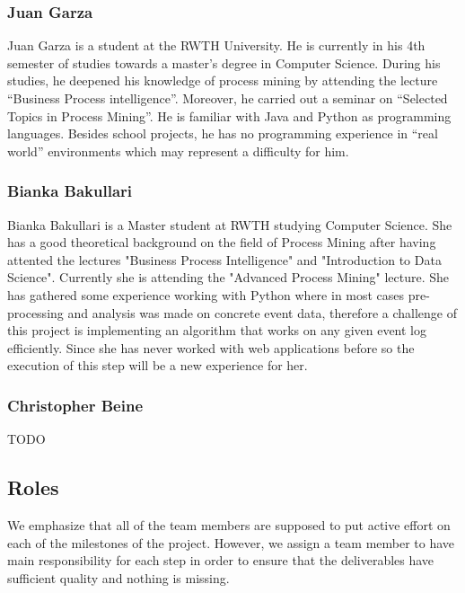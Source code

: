 \documentclass[notitlepage]{article}
\begin{document}
\begin{flushleft}
\subsubsection*{Juan Garza}

Juan Garza is a student at the RWTH University. He is currently in his 4th semester of studies towards a master’s degree in Computer Science. During his studies, he deepened his knowledge of process mining by attending the lecture “Business Process intelligence”. Moreover, he carried out a seminar on “Selected Topics in Process Mining”. He is familiar with Java and Python as programming languages. Besides school projects, he has no programming experience in “real world” environments which may represent a difficulty for him. 

\subsubsection*{Bianka Bakullari}

Bianka Bakullari is a Master student at RWTH studying Computer Science.
She has a good theoretical background on the field of Process Mining after having attented the lectures "Business Process Intelligence" and "Introduction to Data Science". 
Currently she is attending the "Advanced Process Mining" lecture.
She has gathered some experience working with Python where in most cases pre-processing and analysis was made on concrete event data, therefore a challenge of this project is implementing an algorithm that works on any given event log efficiently.
Since she has never worked with web applications before so the execution of this step will be a new experience for her.


\subsubsection*{Christopher Beine}
{\color{red} TODO}

\subsection{Roles}
We emphasize that all of the team members are supposed to put active effort on each of the milestones of the project.
However, we assign a team member to have main responsibility for each step in order to ensure that the deliverables have sufficient quality and nothing is missing.


\end{flushleft}
\end{document}
